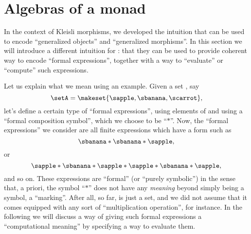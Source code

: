 
\section{Algebras of a monad}
\label{sec:Eilenberg-Moore}



In the context of Kleisli morphisms, we developed the intuition that  can be used to encode ``generalized objects'' and ``generalized morphisms''.
In this section we will introduce a different intuition for : that they can be used to provide coherent way to encode ``formal expressions'', together with a way to ``evaluate'' or ``compute'' such expressions.

Let us explain what we mean using an example.
Given a set \setA, say
\begin{equation}
    \setA = \makeset{ \sapple, \sbanana, \scarrot },
\end{equation}
let's define a certain type of ``formal expressions'', using elements of \setA and using a ``formal composition symbol'', which we choose to be ``$*$''.
Now, the ``formal expressions'' we consider are all finite expressions which have a form such as
\begin{equation}
    \label{eq:formal-composition-1}
    \sbanana * \sbanana * \sapple,
\end{equation}
or
\begin{equation}
    \label{eq:formal-composition-2}
    \sapple * \sbanana * \sapple * \sapple * \sbanana * \sapple,
\end{equation}
and so on.
These expressions are ``formal'' (or ``purely symbolic'') in the sense that, a priori, the symbol ``$*$'' does not have any \emph{meaning} beyond simply being a symbol, a ``marking''.
After all, so far, \setA is just a set, and we did not assume that it comes equipped with any sort of ``multiplication operation'', for instance.
In the following we will discuss a way of giving such formal expressions a ``computational meaning'' by specifying a way to evaluate them.

